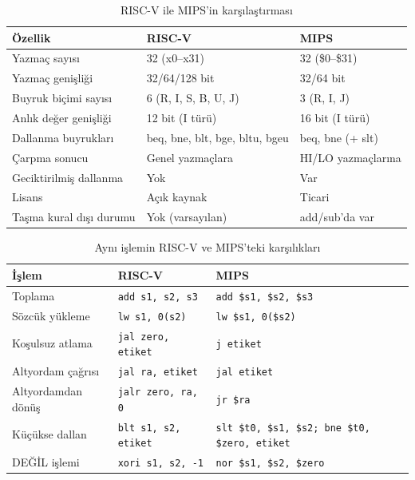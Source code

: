 \begin{table}[H]
\centering
\caption{RISC-V ile MIPS'in karşılaştırması}
\label{tab:riscv-mips-karsilastirma}
\small
\begin{tabular}{lll}
\toprule
\textbf{Özellik} & \textbf{RISC-V} & \textbf{MIPS} \\
\midrule
Yazmaç sayısı       & 32 (x0--x31)          & 32 (\$0--\$31) \\
Yazmaç genişliği    & 32/64/128 bit         & 32/64 bit \\
Buyruk biçimi sayısı & 6 (R, I, S, B, U, J) & 3 (R, I, J) \\
Anlık değer genişliği & 12 bit (I türü)     & 16 bit (I türü) \\
Dallanma buyrukları  & beq, bne, blt, bge, bltu, bgeu & beq, bne (+ slt) \\
Çarpma sonucu        & Genel yazmaçlara     & HI/LO yazmaçlarına \\
Geciktirilmiş dallanma & Yok                & Var \\
Lisans               & Açık kaynak          & Ticari \\
Taşma kural dışı durumu       & Yok (varsayılan)     & add/sub'da var \\
\bottomrule
\end{tabular}
\end{table}

\begin{table}[H]
\centering
\caption{Aynı işlemin RISC-V ve MIPS'teki karşılıkları}
\label{tab:riscv-mips-buyruk}
\small
\begin{tabular}{lll}
\toprule
\textbf{İşlem} & \textbf{RISC-V} & \textbf{MIPS} \\
\midrule
Toplama        & \texttt{add s1, s2, s3}      & \texttt{add \$s1, \$s2, \$s3} \\
Sözcük yükleme & \texttt{lw s1, 0(s2)}        & \texttt{lw \$s1, 0(\$s2)} \\
Koşulsuz atlama & \texttt{jal zero, etiket}   & \texttt{j etiket} \\
Altyordam çağrısı & \texttt{jal ra, etiket}   & \texttt{jal etiket} \\
Altyordamdan dönüş & \texttt{jalr zero, ra, 0} & \texttt{jr \$ra} \\
Küçükse dallan & \texttt{blt s1, s2, etiket}  & \texttt{slt \$t0, \$s1, \$s2; bne \$t0, \$zero, etiket} \\
DEĞİL işlemi  & \texttt{xori s1, s2, -1}     & \texttt{nor \$s1, \$s2, \$zero} \\
\bottomrule
\end{tabular}
\end{table}


